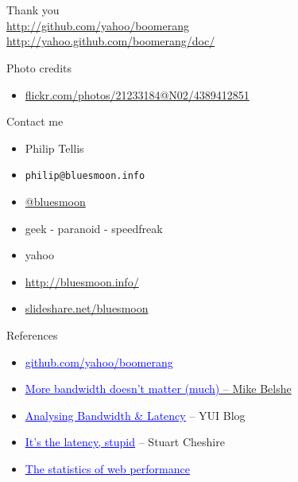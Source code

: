 \documentclass{beamer}
\begin{document}
\section{}

\begin{frame}{}
  \begin{center}
  Thank you \\
  \tiny{
  \href{http://www.github.com/yahoo/boomerang/}{http://github.com/yahoo/boomerang} \\
  \href{http://yahoo.github.com/boomerang/doc/}{http://yahoo.github.com/boomerang/doc/}
  }
  \end{center}
\end{frame}

\begin{frame}{Photo credits}
  \begin{itemize}
  \item \href{http://www.flickr.com/photos/21233184@N02/4389412851/}{flickr.com/photos/21233184@N02/4389412851}
  \end{itemize}
\end{frame}

\begin{frame}{Contact me}
  \begin{itemize}
  \item Philip Tellis
  \item \small{\texttt{philip@bluesmoon.info}}
  \item \href{http://twitter.com/bluesmoon}{@bluesmoon}
  \item geek - paranoid - speedfreak
  \item yahoo
  \item \href{http://bluesmoon.info/}{http://bluesmoon.info/}
  \item \href{http://www.slideshare.net/bluesmoon}{slideshare.net/bluesmoon}
  \end{itemize}
\end{frame}

\begin{frame}{References}
  \begin{itemize}
  \item \href{http://github.com/yahoo/boomerang/}{\textcolor{blue}{\underline{github.com/yahoo/boomerang}}}
  \item \href{http://www.belshe.com/2010/05/24/more-bandwidth-doesnt-matter-much/}{\textcolor{blue}{\underline{More bandwidth doesn't matter (much)}} -- Mike Belshe}
  \item \href{http://www.yuiblog.com/blog/2010/04/08/analyzing-bandwidth-and-latency/}{\textcolor{blue}{\underline{Analysing Bandwidth \& Latency}}} -- YUI Blog
  \item \href{http://www.stuartcheshire.org/rants/Latency.html}{\textcolor{blue}{\underline{It's the latency, stupid}}} -- Stuart Cheshire
  \item \href{http://www.slideshare.net/bluesmoon/index-3441823}{\textcolor{blue}{\underline{The statistics of web performance}}}
  \end{itemize}
\end{frame}
\end{document}
